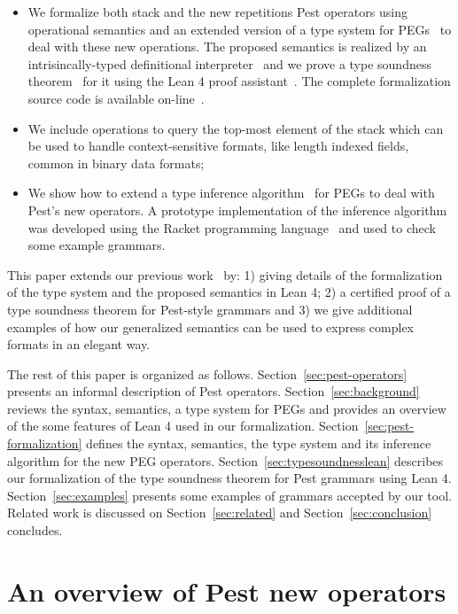 \documentclass[preprint,12pt]{elsarticle}
\theoremstyle{definition}
\begin{document}
\begin{itemize}
  \item We formalize both stack and the new repetitions Pest operators using
    operational semantics and an extended version of a type system for PEGs~\cite{Ribeiro19}
    to deal with these new operations. The proposed semantics is realized by an
    intrisincally-typed definitional interpreter~\cite{Poulsen17} and we prove
    a type soundness theorem~\cite{Amin17} for it using the Lean 4 proof assistant~\cite{demoura2021}.
    The complete formalization source code is available on-line~\cite{pegrepository}.
  \item We include operations to query the top-most element of the stack
    which can be used to handle context-sensitive formats, like length
    indexed fields, common in binary data formats;
  \item We show how to extend a type inference algorithm~\cite{Cardoso23} for PEGs
    to deal with Pest's new operators. A prototype implementation of the inference
    algorithm was developed using the Racket programming language~\cite{Culpepper19}
    and used to check some example grammars.
\end{itemize}

This paper extends our previous work~\cite{Daher25} by: 1) giving details of the
formalization of the type system and the proposed semantics in Lean 4; 2)
a certified proof of a type soundness theorem for Pest-style grammars and 3)
we give additional examples of how our generalized semantics can be used to
express complex formats in an elegant way.

The rest of this paper is organized as follows.
Section~\ref{sec:pest-operators} presents an informal description of Pest operators.
Section~\ref{sec:background}
reviews the syntax, semantics, a type system for
PEGs and provides an overview of the some features of Lean 4 used in our formalization.
Section~\ref{sec:pest-formalization} defines the syntax, semantics, the type
system and its inference algorithm for the new PEG operators. Section~\ref{sec:typesoundnesslean}
describes our formalization of the type soundness theorem for Pest grammars using Lean 4.
Section~\ref{sec:examples}
presents some examples of grammars accepted by our tool.
Related work is discussed on Section~\ref{sec:related} and
Section~\ref{sec:conclusion} concludes.


\section{An overview of Pest new operators}~\label{sec:pest-operators}
\end{document}
